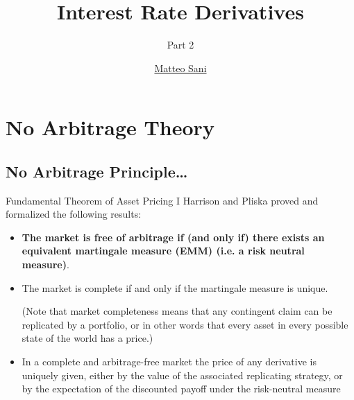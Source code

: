 \documentclass{beamer}
\title{Interest Rate Derivatives}
\subtitle{Part 2}
\author{\href{mailto:matteo.sani@unisi.it}{Matteo Sani}}
\begin{document}
	\begin{frame}[plain]
		\maketitle
	\end{frame}

	\section{No Arbitrage Theory}
	\subsection{No Arbitrage Principle\ldots}

		{
		\begin{frame}{Fundamental Theorem of Asset Pricing I}
			Harrison and Pliska proved and formalized the following results:
			\begin{itemize}
				\item<1-> \textbf{The market is free of arbitrage if (and only if) there exists an \textcolor{maincolor}{equivalent martingale measure} (EMM) (i.e. a risk neutral measure)}.
				\item<0> The market is \textcolor{maincolor}{complete} if and only if the martingale measure is unique.

				(Note that market completeness means that any contingent claim can be replicated by a portfolio, or in other words that every asset in every possible state of the world has a price.)
				\item<0> In a complete and arbitrage-free market the price of any derivative is uniquely given, either by the value of the associated replicating strategy, or by the expectation of the discounted payoff under the risk-neutral measure
			\end{itemize}
		\end{frame}
	}
\end{document}
